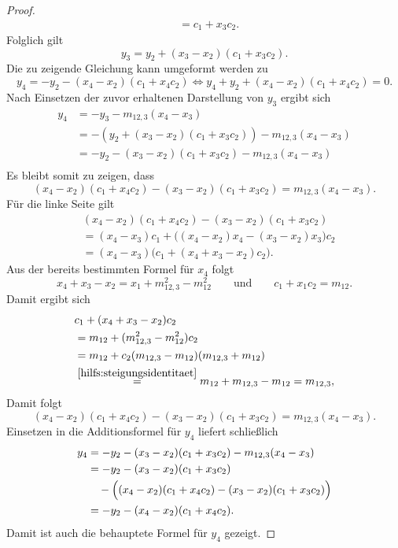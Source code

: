 \begin{proof}
\begin{align*}
         & =c_1+x_3c_2.
    \end{align*}
    Folglich gilt
    \[
        y_3=y_2+(x_3-x_2)(c_1+x_3c_2).
    \]
    Die zu zeigende Gleichung kann umgeformt werden zu
    \[
        y_4=-y_2-(x_4-x_2)(c_1+x_4c_2) \Longleftrightarrow y_4+y_2+(x_4-x_2)(c_1+x_4c_2)=0.
    \]
    Nach Einsetzen der zuvor erhaltenen Darstellung von $y_3$ ergibt sich
    \begin{align*}
        y_4 & =-y_3-m_{12,3}(x_4-x_3)                                                    \\
            & =  -(y_2+(x_3-x_2)(c_1+x_3c_2))-m_{12,3}(x_4-x_3)                          \\
            & =                             -y_2-(x_3-x_2)(c_1+x_3c_2)-m_{12,3}(x_4-x_3) \\
    \end{align*}
    Es bleibt somit zu zeigen, dass
    \[
        (x_4-x_2)(c_1+x_4c_2)
        -(x_3-x_2)(c_1+x_3c_2)
        =
        m_{12,3}(x_4-x_3).
    \]
    Für die linke Seite gilt
    \begin{align*}
         & (x_4-x_2)(c_1+x_4c_2)
        -(x_3-x_2)(c_1+x_3c_2)                   \\
         & =
        (x_4-x_3)c_1
        +
        \bigl((x_4-x_2)x_4-(x_3-x_2)x_3\bigr)c_2 \\
         & =
        (x_4-x_3)
        \bigl(c_1+(x_4+x_3-x_2)c_2\bigr).
    \end{align*}
    Aus der bereits bestimmten Formel für $x_4$ folgt
    \[
        x_4+x_3-x_2 = x_1+m_{12,3}^2-m_{12}^2 \qquad \text{und}\qquad  c_1+x_1c_2=m_{12}.
    \]
    Damit ergibt sich
    \[
        \begin{aligned}
             & c_1+(x_4+x_3-x_2)c_2                                               \\
             & =m_{12}+(m_{12,3}^2-m_{12}^2)c_2                                   \\
             & =m_{12}
            +c_2(m_{12,3}-m_{12})(m_{12,3}+m_{12})                                \\
             & \overset{\ref{hilfs:steigungsidentitaet}}{=}m_{12}+m_{12,3}-m_{12}
            =m_{12,3},
        \end{aligned}
    \]
    Damit folgt
    \[
        (x_4-x_2)(c_1+x_4c_2)-(x_3-x_2)(c_1+x_3c_2)=m_{12,3}(x_4-x_3).
    \]
    Einsetzen in die Additionsformel für $y_4$ liefert schließlich
    \begin{align*}
        y_4
         & = -y_2-(x_3-x_2)(c_1+x_3c_2)
        -m_{12,3}(x_4-x_3)               \\
         & = -y_2-(x_3-x_2)(c_1+x_3c_2)  \\
         & \quad
        -\Bigl((x_4-x_2)(c_1+x_4c_2)
        -(x_3-x_2)(c_1+x_3c_2)\Bigr)     \\
         & = -y_2-(x_4-x_2)(c_1+x_4c_2).
    \end{align*}
    Damit ist auch die behauptete Formel für $y_4$ gezeigt.
\end{proof}

